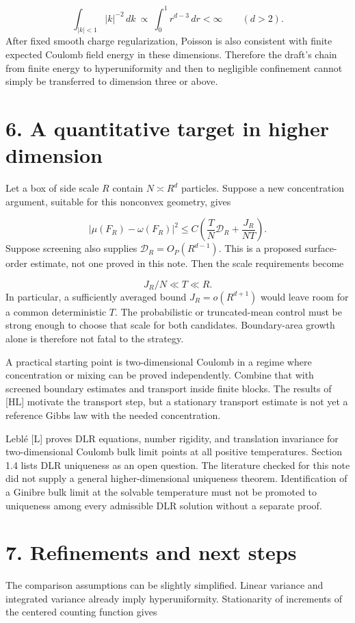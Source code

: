 \documentclass[11pt]{article}
\begin{document}
\[
\int_{|k|<1}|k|^{-2}\,dk\ \propto\ \int_0^1r^{d-3}\,dr<\infty\qquad(d>2).
\]
After fixed smooth charge regularization, Poisson is also consistent with finite expected Coulomb field energy in these dimensions. Therefore the draft's chain from finite energy to hyperuniformity and then to negligible confinement cannot simply be transferred to dimension three or above.

\section*{6. A quantitative target in higher dimension}
Let a box of side scale $R$ contain $N\asymp R^d$ particles. Suppose a new concentration argument, suitable for this nonconvex geometry, gives

\[
|\mu(F_R)-\omega(F_R)|^2\leq C\left(\frac{T}{N}\mathcal D_R+\frac{J_R}{NT}\right).
\]
Suppose screening also supplies $\mathcal D_R=O_P(R^{d-1})$. This is a proposed surface-order estimate, not one proved in this note. Then the scale requirements become

\[
J_R/N\ll T\ll R.
\]
In particular, a sufficiently averaged bound $J_R=o(R^{d+1})$ would leave room for a common deterministic $T$. The probabilistic or truncated-mean control must be strong enough to choose that scale for both candidates. Boundary-area growth alone is therefore not fatal to the strategy.

A practical starting point is two-dimensional Coulomb in a regime where concentration or mixing can be proved independently. Combine that with screened boundary estimates and transport inside finite blocks. The results of [HL] motivate the transport step, but a stationary transport estimate is not yet a reference Gibbs law with the needed concentration.

Leblé [L] proves DLR equations, number rigidity, and translation invariance for two-dimensional Coulomb bulk limit points at all positive temperatures. Section 1.4 lists DLR uniqueness as an open question. The literature checked for this note did not supply a general higher-dimensional uniqueness theorem. Identification of a Ginibre bulk limit at the solvable temperature must not be promoted to uniqueness among every admissible DLR solution without a separate proof.

\section*{7. Refinements and next steps}
The comparison assumptions can be slightly simplified. Linear variance and integrated variance already imply hyperuniformity. Stationarity of increments of the centered counting function gives
\end{document}
